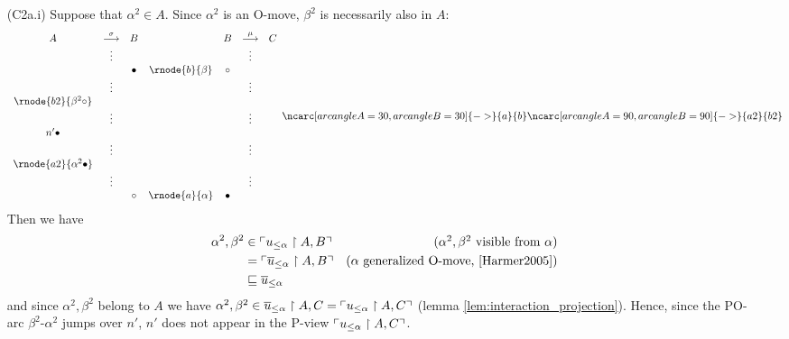 \begin{itemize}
\begin{itemize}
\begin{itemize}
\begin{itemize}
\item[(C2a.i)] Suppose that $\alpha^2 \in A$. Since $\alpha^2$ is an O-move,
$\beta^2$ is necessarily also in $A$:
$$ 
\begin{array}{ccccccc}
A & \stackrel\sigma{\longrightarrow} & B & & B & \stackrel\mu{\longrightarrow} & C \\
&\vdots&&& & \vdots\\
&&\omove & \rnode{b}{\beta} & \pmove \\
&\vdots &&&& \vdots  \\
\rnode{b2}{\beta^2 \pmove}&  \\
& \vdots &&&&\vdots  \\
n' \omove && & &  \\
& \vdots &&&&\vdots  \\
\rnode{a2}{\alpha^2 \omove}& \\
& \vdots &&&&\vdots  \\
&&\pmove & \rnode{a}{\alpha} & \omove \\
\end{array}
\ncarc[arcangleA=30,arcangleB=30]{->}{a}{b}
\ncarc[arcangleA=90,arcangleB=90]{->}{a2}{b2}
 $$  
Then we have 
\begin{align*}
\alpha^2,\beta^2 &\in \pview{u_{\leq \alpha} \upharpoonright A, B}
& \mbox{($\alpha^2,\beta^2$ visible from $\alpha$)} \\
&= \pview{\overline{u}_{\leq \alpha} \upharpoonright A,B} & \mbox{($\alpha$ generalized O-move, \cite[Lemma 3.3.1]{Harmer2005})} \\ 
& \sqsubseteq \overline{u}_{\leq \alpha}
\end{align*}
and since $\alpha^2,\beta^2$ belong to $A$ we have 
$\alpha^2,\beta^2  \in 
\overline{u}_{\leq \alpha} \upharpoonright A,C 
= \ulcorner u_{\leq \alpha} \upharpoonright A,C \urcorner$ (lemma \ref{lem:interaction_projection}).
Hence, since the PO-arc $\beta^2$-$\alpha^2$ jumps over $n'$, $n'$ does not appear in the P-view  $\ulcorner u_{\leq \alpha} \upharpoonright A,C \urcorner$.


\end{itemize}
\end{itemize}
\end{itemize}
\end{itemize}
